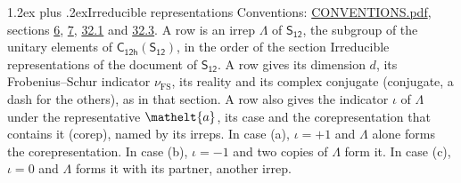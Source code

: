 \documentclass[10pt,a4paper]{article}
\makeatletter
\renewcommand\section{\@startsection{section}{1}{\z@}{-3ex plus -1ex minus -.2ex}%
  {1.2ex plus .2ex}{\normalfont\large\sffamily\bfseries\color{parttitle}}}
\numberwithin{equation}{section}
\newcommand{\eltfont}[1]{{\let\sigma\eltsigma\mathelt{#1}}}
\newcommand{\grp}[1]{\mathsf{#1}}
\newcommand{\elt}[1]{\eltfont{#1}}
\newcommand{\fsind}{\nu_{\mathrm{FS}}}
\makeatother
\begin{document}
\section{Irreducible representations}\label{s:irreps}
Conventions: \href{../../CONVENTIONS.pdf}{CONVENTIONS.pdf}, sections \href{../../../rotation/CONVENTIONS.pdf\#conv.6}{6}, \href{../../../rotation/CONVENTIONS.pdf\#conv.7}{7}, \href{../../CONVENTIONS.pdf\#conv.32.1}{32.1} and \href{../../CONVENTIONS.pdf\#conv.32.3}{32.3}.
\leavevmode\label{n:irrep.Delta}A row is an irrep $\Lambda$ of $\grp{S_{12}}$, the subgroup of the unitary elements of $\grp{C_{12h}}(\grp{S_{12}})$, in the order of the section Irreducible representations of the document of \href{../../../rotation/data/pdf/S12.pdf}{$\grp{S_{12}}$}. \label{n:index.dimension}\label{n:index.frobenius}\label{n:head.irrep}\label{n:head.reality}\label{n:head.conjugate}A row gives its dimension $d$, its Frobenius--Schur indicator $\fsind$, its reality and its complex conjugate (conjugate, a dash for the others), as in that section. \label{n:head.case.corep}\label{n:head.corep}A row also gives the indicator $\iota$ of $\Lambda$ under the representative $\elt{a}$, its case and the corepresentation that contains it (corep), named by its irreps. In case (a), $\iota = +1$ and $\Lambda$ alone forms the corepresentation. In case (b), $\iota = -1$ and two copies of $\Lambda$ form it. In case (c), $\iota = 0$ and $\Lambda$ forms it with its partner, another irrep.
\setlength{\emergencystretch}{2em}\par\setlength{\emergencystretch}{0pt}
\end{document}
